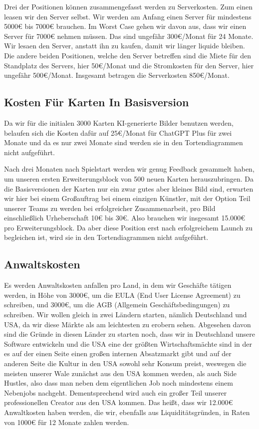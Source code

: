 \documentclass[fontsize=11, a4aper]{scrartcl}
\begin{document}
Drei der Positionen können zusammengefasst werden zu Serverkosten. Zum einen leasen wir den Server selbst. Wir werden am Anfang einen Server für mindestens 5000€ bis 7000€ brauchen. Im Worst Case gehen wir davon aus, dass wir einen Server für 7000€ nehmen müssen. Das sind ungefähr 300€/Monat für 24 Monate. Wir lesaen den Server, anstatt ihn zu kaufen, damit wir länger liquide bleiben. Die andere beiden Positionen, welche den Server betreffen sind die Miete für den Standplatz des Servers, hier 50€/Monat und die Stromkosten für den Server, hier ungefähr 500€/Monat. Insgesamt betragen die Serverkosten 850€/Monat.

\subsection{Kosten Für Karten In Basisversion} \label{subsec:Kosten_Fuer_Karten_In_Basisversion}

Da wir für die initialen 3000 Karten KI-generierte Bilder benutzen werden, belaufen sich die Kosten dafür auf 25€/Monat für \glqq ChatGPT Plus\grqq{} für zwei Monate und da es nur zwei Monate sind werden sie in den Tortendiagrammen nicht aufgeführt.\hfill\newline

\noindent Nach drei Monaten nach Spielstart werden wir genug Feedback gesammelt haben, um unseren ersten Erweiterungsblock von 500 neuen Karten herauszubringen. Da die Basisversionen der Karten nur ein zwar gutes aber kleines Bild sind, erwarten wir hier bei einem Großauftrag bei einem einzigen Künstler, mit der Option Teil unserer Teams zu werden bei erfolgreicher Zusammenarbeit, pro Bild einschließlich Urheberschaft 10€ bis 30€. Also brauchen wir insgesamt 15.000€ pro Erweiterungsblock. Da aber diese Position erst nach erfolgreichem Launch zu begleichen ist, wird sie in den Tortendiagrammen nicht aufgeführt.

\subsection{Anwaltskosten} \label{subsec:Anwaltskosten}

Es werden Anwaltskosten anfallen pro Land, in dem wir Geschäfte tätigen werden, in Höhe von 3000€, um die EULA (End User License Agreement) zu schreiben, und 3000€, um die AGB (Allgemein Geschäftsbedingungen) zu schreiben. Wir wollen gleich in zwei Ländern starten, nämlich Deutschland und USA, da wir diese Märkte als am leichtesten zu erobern sehen. Abgesehen davon sind die Gründe in diesen Länder zu starten noch, dass wir in Deutschland unsere Software entwickeln und die USA eine der größten Wirtschaftsmächte sind in der es auf der einen Seite einen großen internen Absatzmarkt gibt und auf der anderen Seite die Kultur in den USA sowohl sehr Konsum preist, weswegen die meisten unserer Wale zunächst aus den USA kommen werden, als auch Side Hustles, also dass man neben dem eigentlichen Job noch mindestens einem Nebenjobs nachgeht. Dementsprechend wird auch ein großer Teil unserer professionellen Creator aus den USA kommen. Das heißt, dass wir 12.000€ Anwaltkosten haben werden, die wir, ebenfalls aus Liquiditätsgründen, in Raten von 1000€ für 12 Monate zahlen werden.
\end{document}
